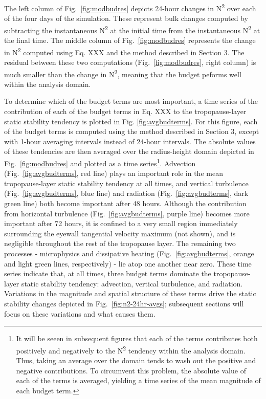 \documentclass{ametsoc}
\begin{document}
The left column of Fig.~\ref{fig:modbudres} depicts 24-hour changes in N\textsuperscript{2} over each of the four days of the simulation. 
These represent bulk changes computed by subtracting the instantaneous N\textsuperscript{2} at the initial time from the instantaneous N\textsuperscript{2} at the final time. 
The middle column of Fig.~\ref{fig:modbudres} represents the change in N\textsuperscript{2} computed using Eq. XXX and the method described in Section 3. 
The residual between these two computations (Fig.~\ref{fig:modbudres}, right column) is much smaller than the change in N\textsuperscript{2}, meaning that the budget peforms well within the analysis domain.

To determine which of the budget terms are most important, a time series of the contribution of each of the budget terms in Eq. XXX to the tropopause-layer static stability tendency is plotted in Fig. \ref{fig:avgbudterms}.
For this figure, each of the budget terms is computed using the method described in Section 3, except with 1-hour averaging intervals instead of 24-hour intervals.
The absolute values of these tendencies are then averaged over the radius-height domain depicted in Fig.~\ref{fig:modbudres} and plotted as a time series\footnote{It will be seeen in subsequent figures that each of the terms contributes both positively and negatively to the N\textsuperscript{2} tendency within the analysis domain. 
Thus, taking an average over the domain tends to wash out the positive and negative contributions.
To circumvent this problem, the absolute value of each of the terms is averaged, yielding a time series of the mean magnitude of each budget term.}. 
Advection (Fig.~\ref{fig:avgbudterms}, red line) plays an important role in the mean tropopause-layer static stability tendency at all times, and vertical turbulence (Fig.~\ref{fig:avgbudterms}, blue line) and radiation (Fig.~\ref{fig:avgbudterms}, dark green line) both become important after 48 hours.
Although the contribution from horizontal turbulence (Fig.~\ref{fig:avgbudterms}, purple line) becomes more important after 72 hours, it is confined to a very small region immediately surrounding the eyewall tangential velocity maximum (not shown), and is negligible throughout the rest of the tropopause layer.
The remaining two processes - microphysics and dissipative heating (Fig.~\ref{fig:avgbudterms}, orange and light green lines, respectively) - lie atop one another near zero.
These time series indicate that, at all times, three budget terms dominate the tropopause-layer static stability tendency: advection, vertical turbulence, and radiation.
Variations in the magnitude and spatial structure of these terms drive the static stability changes depicted in Fig.~\ref{fig:n2-24hr-avgs}; subsequent sections will focus on these variations and what causes them.
\end{document}
